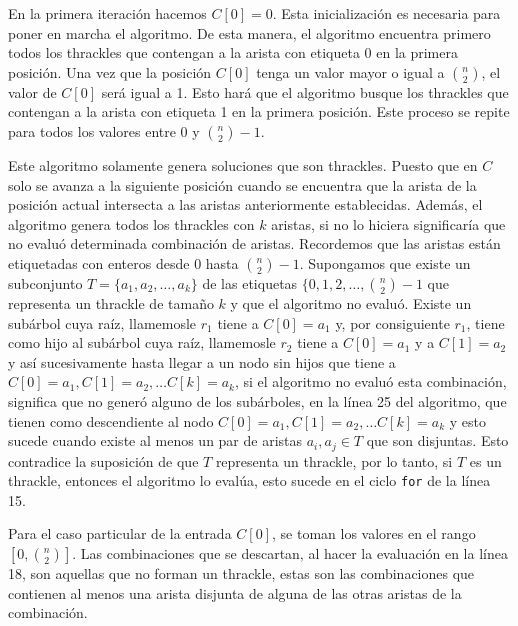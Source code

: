   En la primera iteración hacemos $C[0] = 0$. Esta inicialización es necesaria para poner
  en marcha el algoritmo. De esta manera, el algoritmo encuentra primero todos
  los thrackles que contengan a la arista con etiqueta 0 en la primera posición. Una vez que la posición $C[0]$ tenga un valor mayor o igual a $\binom{n}{2}$, el valor de
  $C[0]$ será igual a 1. Esto hará que el algoritmo busque los thrackles que
  contengan a la arista con etiqueta 1 en la primera posición. Este proceso se repite para todos los valores entre $0$ y $\binom{n}{2}-1$.

  Este algoritmo solamente genera soluciones que son thrackles.
  Puesto que en $C$ solo se avanza a la siguiente posición
  cuando se encuentra que la arista de la posición actual intersecta a las
  aristas anteriormente establecidas. Además, el algoritmo genera todos los
  thrackles con $k$ aristas, si no lo hiciera significaría que no evaluó
  determinada combinación de aristas. Recordemos que las aristas están etiquetadas
  con enteros desde $0$ hasta $\binom{n}{2}-1$. Supongamos que existe un subconjunto
  $T=\{a_1,a_2,\dots,a_k\}$ de las etiquetas $\{0,1,2,\dots,\binom{n}{2}-1$ que
  representa un thrackle de tamaño $k$ y que el algoritmo no evaluó. Existe un subárbol
  cuya raíz, llamemosle $r_1$ tiene a $C[0]=a_1$ y, por consiguiente $r_1$, tiene como
  hijo al subárbol cuya raíz, llamemosle $r_2$ tiene a $C[0]=a_1$ y a $C[1]=a_2$ y así
  sucesivamente hasta llegar a un nodo sin hijos que tiene a $C[0]=a_1,C[1]=a_2,\dots
  C[k]=a_k$, si el algoritmo no evaluó esta combinación, significa que no generó alguno
  de los subárboles, en la línea 25 del algoritmo, que tienen como descendiente al nodo
  $C[0]=a_1,C[1]=a_2,\dots C[k]=a_k$ y esto sucede cuando existe al menos un par de
  aristas $a_i,a_j\in T$ que son  disjuntas. Esto contradice la suposición de que $T$
  representa un thrackle, por lo tanto, si $T$ es un thrackle, entonces el algoritmo lo
  evalúa, esto sucede en el ciclo \texttt{for} de la línea 15.

  Para el caso particular de la entrada $C[0]$, se toman los valores en el rango $\left[ 0, \binom{n}{2}\right]$. Las combinaciones que se descartan, al hacer la evaluación en la línea 18, son aquellas que no forman un thrackle, estas son las combinaciones que contienen al menos una arista disjunta de alguna de las otras aristas de la combinación.

